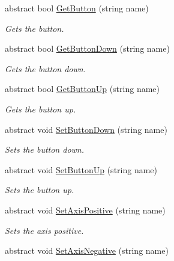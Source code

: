 \begin{DoxyCompactItemize}
abstract bool \hyperlink{class_lerp2_assets_1_1_cross_platform_input_1_1_cross_platform_input_1_1_virtual_input_a9ac8aa7751c188bb7b1320c7b2fea12e}{Get\+Button} (string name)
\begin{DoxyCompactList}\small\item\em Gets the button. \end{DoxyCompactList}\item 
abstract bool \hyperlink{class_lerp2_assets_1_1_cross_platform_input_1_1_cross_platform_input_1_1_virtual_input_a0e032fff9d6abc32017cee10d69d32d4}{Get\+Button\+Down} (string name)
\begin{DoxyCompactList}\small\item\em Gets the button down. \end{DoxyCompactList}\item 
abstract bool \hyperlink{class_lerp2_assets_1_1_cross_platform_input_1_1_cross_platform_input_1_1_virtual_input_aab782d66a80ed30cd1234f1f218fb968}{Get\+Button\+Up} (string name)
\begin{DoxyCompactList}\small\item\em Gets the button up. \end{DoxyCompactList}\item 
abstract void \hyperlink{class_lerp2_assets_1_1_cross_platform_input_1_1_cross_platform_input_1_1_virtual_input_a05c1d0c7a50c30a22c52bf460ec6a17a}{Set\+Button\+Down} (string name)
\begin{DoxyCompactList}\small\item\em Sets the button down. \end{DoxyCompactList}\item 
abstract void \hyperlink{class_lerp2_assets_1_1_cross_platform_input_1_1_cross_platform_input_1_1_virtual_input_ae813c350c71501f35ed2aefa375b233c}{Set\+Button\+Up} (string name)
\begin{DoxyCompactList}\small\item\em Sets the button up. \end{DoxyCompactList}\item 
abstract void \hyperlink{class_lerp2_assets_1_1_cross_platform_input_1_1_cross_platform_input_1_1_virtual_input_a5a8ad2347e4e25f7ccd55939346e1b69}{Set\+Axis\+Positive} (string name)
\begin{DoxyCompactList}\small\item\em Sets the axis positive. \end{DoxyCompactList}\item 
abstract void \hyperlink{class_lerp2_assets_1_1_cross_platform_input_1_1_cross_platform_input_1_1_virtual_input_af420a2c8478dd23fd7ecc2ba035eeb88}{Set\+Axis\+Negative} (string name)

\end{DoxyCompactItemize}
